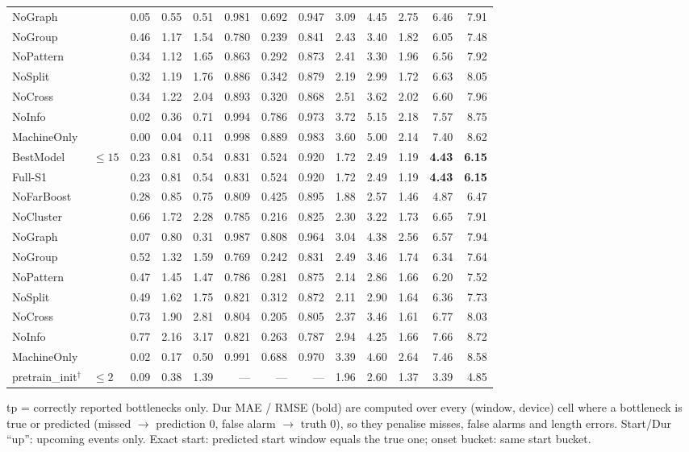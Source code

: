 \documentclass[9pt,a4paper,twocolumn]{extarticle}
\begin{document}
\begin{table}[tp]
\begin{tabular}{llrrrrrrrrrrr}
NoGraph &  & 0.05 & 0.55 & 0.51 & 0.981 & 0.692 & 0.947 & 3.09 & 4.45 & 2.75 & 6.46 & 7.91 \\
NoGroup &  & 0.46 & 1.17 & 1.54 & 0.780 & 0.239 & 0.841 & 2.43 & 3.40 & 1.82 & 6.05 & 7.48 \\
NoPattern &  & 0.34 & 1.12 & 1.65 & 0.863 & 0.292 & 0.873 & 2.41 & 3.30 & 1.96 & 6.56 & 7.92 \\
NoSplit &  & 0.32 & 1.19 & 1.76 & 0.886 & 0.342 & 0.879 & 2.19 & 2.99 & 1.72 & 6.63 & 8.05 \\
NoCross &  & 0.34 & 1.22 & 2.04 & 0.893 & 0.320 & 0.868 & 2.51 & 3.62 & 2.02 & 6.60 & 7.96 \\
NoInfo &  & 0.02 & 0.36 & 0.71 & 0.994 & 0.786 & 0.973 & 3.72 & 5.15 & 2.18 & 7.57 & 8.75 \\
MachineOnly &  & 0.00 & 0.04 & 0.11 & 0.998 & 0.889 & 0.983 & 3.60 & 5.00 & 2.14 & 7.40 & 8.62 \\
\midrule
BestModel & $\le 15$ & 0.23 & 0.81 & 0.54 & 0.831 & 0.524 & 0.920 & 1.72 & 2.49 & 1.19 & \textbf{4.43} & \textbf{6.15} \\
Full-S1 &  & 0.23 & 0.81 & 0.54 & 0.831 & 0.524 & 0.920 & 1.72 & 2.49 & 1.19 & \textbf{4.43} & \textbf{6.15} \\
NoFarBoost &  & 0.28 & 0.85 & 0.75 & 0.809 & 0.425 & 0.895 & 1.88 & 2.57 & 1.46 & 4.87 & 6.47 \\
NoCluster &  & 0.66 & 1.72 & 2.28 & 0.785 & 0.216 & 0.825 & 2.30 & 3.22 & 1.73 & 6.65 & 7.91 \\
NoGraph &  & 0.07 & 0.80 & 0.31 & 0.987 & 0.808 & 0.964 & 3.04 & 4.38 & 2.56 & 6.57 & 7.94 \\
NoGroup &  & 0.52 & 1.32 & 1.59 & 0.769 & 0.242 & 0.831 & 2.49 & 3.46 & 1.74 & 6.34 & 7.64 \\
NoPattern &  & 0.47 & 1.45 & 1.47 & 0.786 & 0.281 & 0.875 & 2.14 & 2.86 & 1.66 & 6.20 & 7.52 \\
NoSplit &  & 0.49 & 1.62 & 1.75 & 0.821 & 0.312 & 0.872 & 2.11 & 2.90 & 1.64 & 6.36 & 7.73 \\
NoCross &  & 0.73 & 1.90 & 2.81 & 0.804 & 0.205 & 0.805 & 2.37 & 3.46 & 1.61 & 6.77 & 8.03 \\
NoInfo &  & 0.77 & 2.16 & 3.17 & 0.821 & 0.263 & 0.787 & 2.94 & 4.25 & 1.66 & 7.66 & 8.72 \\
MachineOnly &  & 0.02 & 0.17 & 0.50 & 0.991 & 0.688 & 0.970 & 3.39 & 4.60 & 2.64 & 7.46 & 8.58 \\
\midrule
pretrain\_init$^\dagger$ & $\le 2$ & 0.09 & 0.38 & 1.39 & --- & --- & --- & 1.96 & 2.60 & 1.37 & 3.39 & 4.85 \\
\bottomrule
\end{tabular}
\par\smallskip\parbox{\textwidth}{\scriptsize tp = correctly reported bottlenecks only. Dur MAE / RMSE (bold) are computed over every (window, device) cell where a bottleneck is true or predicted (missed $\to$ prediction 0, false alarm $\to$ truth 0), so they penalise misses, false alarms and length errors. Start/Dur ``up'': upcoming events only. Exact start: predicted start window equals the true one; onset bucket: same start bucket.}
\end{table}
\end{document}
